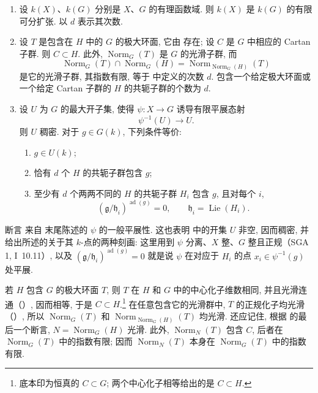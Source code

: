 \begin{enumerate}
\item[\textit{a)}] 
  设 \(k(X)\)、\(k(G)\) 分别是 \(X\)、\(G\) 的有理函数域. 则 \(k(X)\) 是 \(k(G)\) 的有限可分扩张. 以 \(d\) 表示其次数.

\item[\textit{b)}] 
  设 \(T\) 是包含在 \(H\) 中的 \(G\) 的极大环面, 它由  存在; 设 \(C\) 是 \(G\) 中相应的 Cartan 子群. 则 \(C\subset H\). 此外, \(\operatorname{Norm}_G(T)\) 是 \(G\) 的光滑子群, 而
  \[
    \operatorname{Norm}_G(T)\cap\operatorname{Norm}_G(H)
    =
    \operatorname{Norm}_{\operatorname{Norm}_G(H)}(T)
  \]
  是它的光滑子群, 其指数有限, 等于  中定义的次数 \(d\). 包含一个给定极大环面或一个给定 Cartan 子群的 \(H\) 的共轭子群的个数为 \(d\).

\item[\textit{c)}] 
  设 \(U\) 为 \(G\) 的最大开子集, 使得 \(\psi:X\to G\) 诱导有限平展态射
  \[
    \psi^{-1}(U)\longrightarrow U.
  \]
  则 \(U\) 稠密. 对于 \(g\in G(k)\), 下列条件等价:
  \begin{enumerate}
  \item {} \(g\in U(k)\);
  \item {} 恰有 \(d\) 个 \(H\) 的共轭子群包含 \(g\);
  \item {} 至少有 \(d\) 个两两不同的 \(H\) 的共轭子群 \(H_i\) 包含 \(g\), 且对每个 \(i\),
    \[
      (\mathfrak g/\mathfrak h_i)^{\operatorname{ad}(g)}=0,
      \qquad \mathfrak h_i=\operatorname{Lie}(H_i).
    \]
  \end{enumerate}
\end{enumerate}

断言  来自  末尾陈述的 \(\psi\) 的一般平展性. 这也表明  中的开集 \(U\) 非空, 因而稠密, 并给出所述的关于其 \(k\)-点的两种刻画: 这里用到 \(\psi\) 分离、\(X\) 整、\(G\) 整且正规（SGA 1, I~10.11）, 以及 \((\mathfrak g/\mathfrak h_i)^{\operatorname{ad}(g)}=0\) 就是说 \(\psi\) 在对应于 \(H_i\) 的点 \(x_i\in\psi^{-1}(g)\) 处平展.

若 \(H\) 包含 \(G\) 的极大环面 \(T\), 则 \(T\) 在 \(H\) 和 \(G\) 中的中心化子维数相同, 并且光滑连通（）, 因而相等, 于是 \(C\subset H\).\footnote{底本印为恒真的 \(C\subset G\); 两个中心化子相等给出的是 \(C\subset H\).} 在任意包含它的光滑群中, \(T\) 的正规化子均光滑（）, 所以 \(\operatorname{Norm}_G(T)\) 和 \(\operatorname{Norm}_{\operatorname{Norm}_G(H)}(T)\) 均光滑. 还应记住, 根据  的最后一个断言, \(N=\operatorname{Norm}_G(H)\) 光滑. 此外, \(\operatorname{Norm}_N(T)\) 包含 \(C\), 后者在 \(\operatorname{Norm}_G(T)\) 中的指数有限; 因而 \(\operatorname{Norm}_N(T)\) 本身在 \(\operatorname{Norm}_G(T)\) 中的指数有限.

